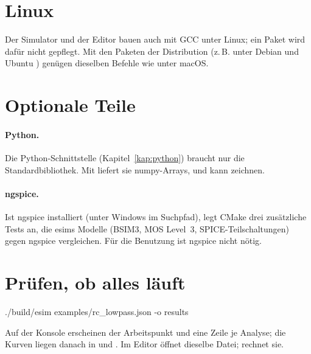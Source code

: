 \section{Linux}

Der Simulator und der Editor bauen auch mit GCC unter Linux; ein Paket wird
dafür nicht gepflegt. Mit den Paketen der Distribution (z.\,B. unter Debian
und Ubuntu )
genügen dieselben Befehle wie unter macOS.

\section{Optionale Teile}

\paragraph{Python.}
Die Python-Schnittstelle (Kapitel~\ref{kap:python}) braucht nur die
Standardbibliothek. Mit  liefert sie
numpy-Arrays, und  kann zeichnen.

\paragraph{ngspice.}
Ist ngspice installiert (unter Windows  im Suchpfad),
legt CMake drei zusätzliche Tests an, die esims Modelle (BSIM3, MOS Level~3,
SPICE-Teilschaltungen) gegen ngspice vergleichen. Für die Benutzung ist
ngspice nicht nötig.

\section{Prüfen, ob alles läuft}

\begin{shell}
./build/esim examples/rc_lowpass.json -o results
\end{shell}

Auf der Konsole erscheinen der Arbeitspunkt und eine Zeile je Analyse; die
Kurven liegen danach in  und
. Im Editor öffnet
\pfad{} dieselbe Datei;  rechnet
sie.
